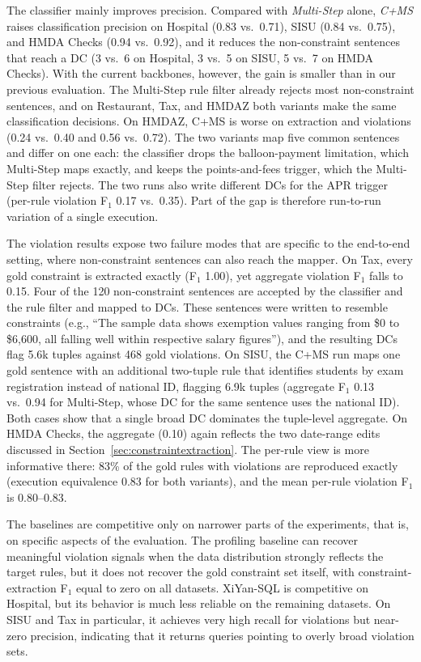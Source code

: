 The classifier mainly improves precision. Compared with \emph{Multi-Step} alone,
\emph{C+MS} raises classification precision on Hospital (0.83 vs.\ 0.71), SISU
(0.84 vs.\ 0.75), and HMDA Checks (0.94 vs.\ 0.92), and it reduces the
non-constraint sentences that reach a DC (3 vs.\ 6 on Hospital, 3 vs.\ 5 on SISU,
5 vs.\ 7 on HMDA Checks). With the current backbones, however, the gain is
smaller than in our previous evaluation. The Multi-Step rule filter already
rejects most non-constraint sentences, and on Restaurant, Tax, and HMDAZ both
variants make the same classification decisions. On HMDAZ, C+MS is worse on
extraction and violations (0.24 vs.\ 0.40 and 0.56 vs.\ 0.72). The two variants
map five common sentences and differ on one each: the classifier drops the
balloon-payment limitation, which Multi-Step maps exactly, and keeps the
points-and-fees trigger, which the Multi-Step filter rejects. The two runs also
write different DCs for the APR trigger (per-rule violation F$_1$ 0.17 vs.\
0.35). Part of the gap is therefore run-to-run variation of a single execution.

The violation results expose two failure modes that are specific to the
end-to-end setting, where non-constraint sentences can also reach the mapper.
On Tax, every gold constraint is extracted exactly (F$_1$ 1.00), yet aggregate
violation F$_1$ falls to 0.15. Four of the 120 non-constraint sentences are
accepted by the classifier and the rule filter and mapped to DCs. These
sentences were written to resemble constraints (e.g., ``The sample data shows
exemption values ranging from \$0 to \$6,600, all falling well within respective
salary figures''), and the resulting DCs flag 5.6k tuples against 468 gold
violations. On SISU, the C+MS run maps one gold sentence with an additional
two-tuple rule that identifies students by exam registration instead of national
ID, flagging 6.9k tuples (aggregate F$_1$ 0.13 vs.\ 0.94 for Multi-Step, whose
DC for the same sentence uses the national ID). Both cases show that a single broad DC dominates the tuple-level
aggregate. On HMDA Checks, the aggregate (0.10) again reflects the two date-range
edits discussed in Section~\ref{sec:constraintextraction}. The per-rule view is
more informative there: 83\% of the gold rules with violations are reproduced
exactly (execution equivalence 0.83 for both variants), and the mean per-rule
violation F$_1$ is 0.80--0.83.

The baselines are competitive only on narrower parts of the experiments, that is, on specific aspects of the evaluation. The profiling baseline can recover meaningful violation signals when the data distribution strongly reflects the target rules, but it does not recover the gold
constraint set itself, with constraint-extraction F$_1$ equal to zero on all datasets. XiYan-SQL is competitive on Hospital, but its behavior is much less reliable on the remaining datasets. On SISU and Tax in particular, it achieves very high recall for violations but near-zero precision, indicating that it returns queries pointing to overly broad violation sets.

